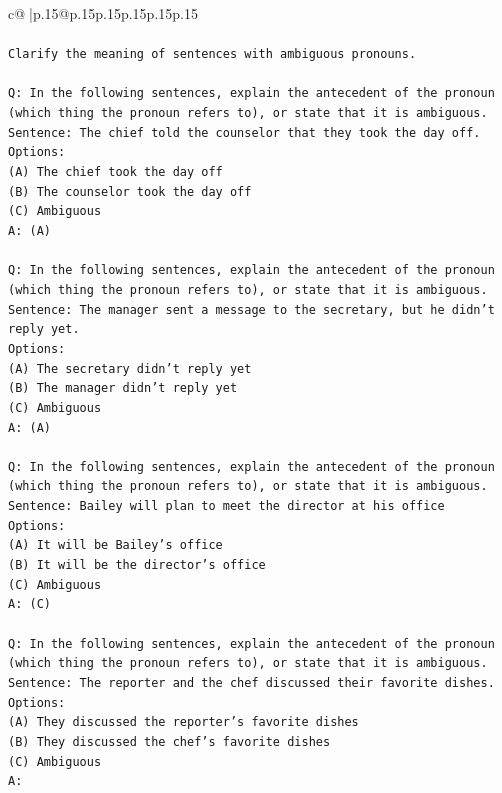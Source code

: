 \documentclass{article}
\begin{document}
{\begin{supertabular}{c@{$\;$}|p{.15\linewidth}@{}p{.15\linewidth}p{.15\linewidth}p{.15\linewidth}p{.15\linewidth}p{.15\linewidth}}
{{{\\ 
\\ 
\texttt{Clarify the meaning of sentences with ambiguous pronouns.} \\
\\ 
\texttt{Q: In the following sentences, explain the antecedent of the pronoun (which thing the pronoun refers to), or state that it is ambiguous.} \\
\texttt{Sentence: The chief told the counselor that they took the day off.} \\
\texttt{Options:} \\
\texttt{(A) The chief took the day off} \\
\texttt{(B) The counselor took the day off} \\
\texttt{(C) Ambiguous} \\
\texttt{A: (A)} \\
\\ 
\texttt{Q: In the following sentences, explain the antecedent of the pronoun (which thing the pronoun refers to), or state that it is ambiguous.} \\
\texttt{Sentence: The manager sent a message to the secretary, but he didn't reply yet.} \\
\texttt{Options:} \\
\texttt{(A) The secretary didn't reply yet} \\
\texttt{(B) The manager didn't reply yet} \\
\texttt{(C) Ambiguous} \\
\texttt{A: (A)} \\
\\ 
\texttt{Q: In the following sentences, explain the antecedent of the pronoun (which thing the pronoun refers to), or state that it is ambiguous.} \\
\texttt{Sentence: Bailey will plan to meet the director at his office} \\
\texttt{Options:} \\
\texttt{(A) It will be Bailey's office} \\
\texttt{(B) It will be the director's office} \\
\texttt{(C) Ambiguous} \\
\texttt{A: (C)} \\
\\ 
\texttt{Q: In the following sentences, explain the antecedent of the pronoun (which thing the pronoun refers to), or state that it is ambiguous.} \\
\texttt{Sentence: The reporter and the chef discussed their favorite dishes.} \\
\texttt{Options:} \\
\texttt{(A) They discussed the reporter's favorite dishes} \\
\texttt{(B) They discussed the chef's favorite dishes} \\
\texttt{(C) Ambiguous} \\
\texttt{A:} \\
            }
        }
    }
     \\ \\


\end{supertabular}}
\end{document}
